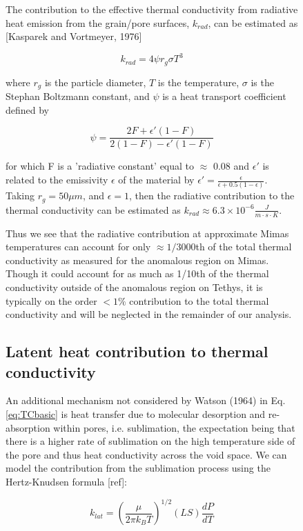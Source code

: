 \documentclass[11pt]{article} %
\begin{document}
\begin{figure}[ht]
	The contribution to the effective thermal conductivity from radiative heat emission from the grain/pore surfaces, $k_{rad}$, can be estimated as [Kasparek and Vortmeyer, 1976]

	\begin{equation}
	k_{rad} = 4 \psi r_{g} \sigma T^{3}
	\end{equation}
	
	where $r_{g}$ is the particle diameter, $T$ is the temperature, $\sigma$ is the Stephan Boltzmann constant, and $\psi$ is a heat transport coefficient defined by
	
	\begin{equation}
	\psi = \frac{2F + \epsilon'(1-F)}{2(1-F)-\epsilon'(1-F)}
	\end{equation}

	for which F is a 'radiative constant' equal to $\approx$ 0.08 and $\epsilon'$ is related to the emissivity $\epsilon$ of the material by $\epsilon' = \frac{\epsilon}{\epsilon +0.5(1-\epsilon)}$. Taking $r_{g} = 50 \mu m$, and $\epsilon = 1$, then the radiative contribution to the thermal conductivity can be estimated as $k_{rad} \approx 6.3\times10^{-6} \frac{J}{m \cdot s \cdot K}$.
	
	Thus we see that the radiative contribution at approximate Mimas temperatures can account for only $\approx 1/3000$th of the total thermal conductivity as measured for the anomalous region on Mimas. Though it could account for as much as 1/10th of the thermal conductivity outside of the anomalous region on Tethys, it is typically on the order $<1\%$ contribution to the total thermal conductivity and will be neglected in the remainder of our analysis.

\subsection{Latent heat contribution to thermal conductivity}
	An additional mechanism not considered by Watson (1964) in Eq.\ref{eq:TCbasic} is heat transfer due to molecular desorption and re-absorption within pores, i.e. sublimation, the expectation being that there is a higher rate of sublimation on the high temperature side of the pore and thus heat conductivity across the void space. We can model the contribution from the sublimation process using the Hertz-Knudsen formula [ref]:

	\begin{equation}
	k_{lat} = ( \frac{\mu}{2 \pi k_{B} T})^{1/2}  (L S) \frac{dP}{dT}
	\end{equation}
	

\end{figure}
\end{document}
